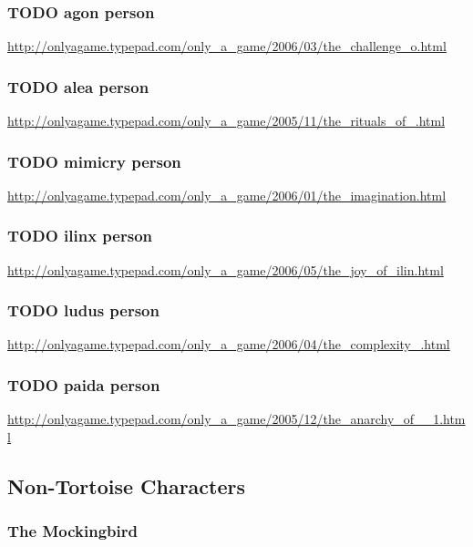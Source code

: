 \documentclass[11pt]{article}
\begin{document}
\subsubsection{{\bfseries\sffamily TODO} agon person}
\label{sec-2-2-21}

\url{http://onlyagame.typepad.com/only_a_game/2006/03/the_challenge_o.html}
\subsubsection{{\bfseries\sffamily TODO} alea person}
\label{sec-2-2-22}

\url{http://onlyagame.typepad.com/only_a_game/2005/11/the_rituals_of_.html}
\subsubsection{{\bfseries\sffamily TODO} mimicry person}
\label{sec-2-2-23}

\url{http://onlyagame.typepad.com/only_a_game/2006/01/the_imagination.html}
\subsubsection{{\bfseries\sffamily TODO} ilinx person}
\label{sec-2-2-24}

\url{http://onlyagame.typepad.com/only_a_game/2006/05/the_joy_of_ilin.html}
\subsubsection{{\bfseries\sffamily TODO} ludus person}
\label{sec-2-2-25}

\url{http://onlyagame.typepad.com/only_a_game/2006/04/the_complexity_.html}
\subsubsection{{\bfseries\sffamily TODO} paida person}
\label{sec-2-2-26}

\url{http://onlyagame.typepad.com/only_a_game/2005/12/the_anarchy_of__1.html}

\subsection{Non-Tortoise Characters}
\label{sec-2-3}

\subsubsection{The Mockingbird}
\label{sec-2-3-1}
\end{document}
